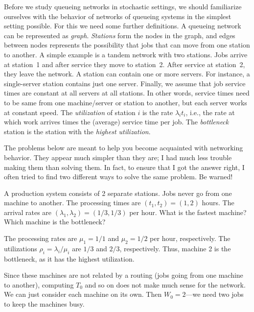 Before we study queueing networks in stochastic settings, we should
familiarize ourselves with the behavior of networks of queueing
systems in the simplest setting possible.  For this we need some
further definitions. A queueing network can be represented as
\emph{graph}. \emph{Stations} form the nodes in the graph, and edges
between nodes represents the possibility that jobs that can move from
one station to another. A simple example is a tandem network with two
stations. Jobs arrive at station~1 and after service they move to
station~2. After service at station~2, they leave the network. A
station can contain one or more servers. For instance, a single-server
station contains just one server. Finally, we assume that job service
times are constant at all servers at all stations. In other words,
service times need to be same from one machine/server or station to
another, but each server works at constant speed.  The
\emph{utilization} of station $i$ is the rate $\lambda_i t_i$, i.e.,
the rate at which work arrives times the (average) service time per
job. The \emph{bottleneck} station is the station with the
\emph{highest utilization}.


The problems below are meant to help you become acquainted with
networking behavior. They appear much simpler than they are; I had
much less trouble making them than solving them. In fact, to ensure
that I got the answer right, I often tried to find two different ways
to solve the same problem. Be warned!

\begin{question}
  A production system consists of 2 separate stations. Jobs never go
  from one machine to another. The processing times are
  $(t_1, t_2) = (1, 2)$ hours. The arrival rates are
  $(\lambda_1, \lambda_2) = (1/3, 1/3)$ per hour. What is the fastest
  machine? Which machine is the bottleneck? 
  \begin{solution}
    The processing rates are $\mu_1=1/1$ and $\mu_2 = 1/2$ per hour,
    respectively. The utilizations $\rho_i=\lambda_i/\mu_i$ are $1/3$
    and $2/3$, respectively. Thus, machine 2 is the bottleneck, as it
    has the highest utilization.

    Since these machines are not related by a routing (jobs going from
    one machine to another), computing $T_0$ and so on does not make
    much sense for the network. We can just consider each machine on
    its own. Then $W_0=2$---we need two jobs to keep the machines
    busy.

  \end{solution}
\end{question}



